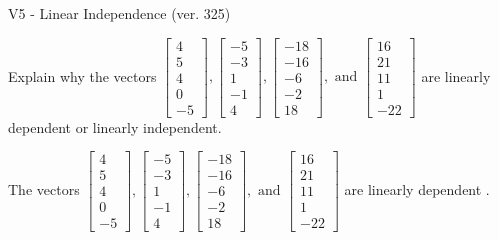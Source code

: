\begin{exercise}
  \begin{exerciseTitle}V5 - Linear Independence (ver. 325)\end{exerciseTitle}
  \begin{exerciseStatement}
    Explain why the vectors \(\left[\begin{array}{r}
4 \\
5 \\
4 \\
0 \\
-5
\end{array}\right] , \left[\begin{array}{r}
-5 \\
-3 \\
1 \\
-1 \\
4
\end{array}\right] , \left[\begin{array}{r}
-18 \\
-16 \\
-6 \\
-2 \\
18
\end{array}\right] , \text{ and } \left[\begin{array}{r}
16 \\
21 \\
11 \\
1 \\
-22
\end{array}\right]\) are linearly dependent or linearly independent.	


  \end{exerciseStatement}
  \begin{exerciseAnswer}
   The vectors \(\left[\begin{array}{r}
4 \\
5 \\
4 \\
0 \\
-5
\end{array}\right] , \left[\begin{array}{r}
-5 \\
-3 \\
1 \\
-1 \\
4
\end{array}\right] , \left[\begin{array}{r}
-18 \\
-16 \\
-6 \\
-2 \\
18
\end{array}\right] , \text{ and } \left[\begin{array}{r}
16 \\
21 \\
11 \\
1 \\
-22
\end{array}\right]\) are 
  	 linearly dependent  .
  


  \end{exerciseAnswer}
\end{exercise}
